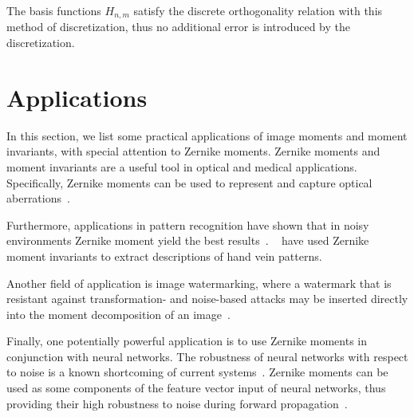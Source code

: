 The basis functions $H_{n,m}$ satisfy the discrete orthogonality relation with this method of discretization, thus no additional error is introduced by the discretization.


\section{Applications}
In this section, we list some practical applications of image moments and moment invariants, with special attention to Zernike moments.
Zernike moments and moment invariants are a useful tool in optical and medical applications. Specifically, Zernike moments can be used to represent and capture optical aberrations~\cite{wavefront,optical_human_eye,opt_surf}.

Furthermore, applications in pattern recognition have shown that in noisy environments Zernike moment yield the best results~\cite{pattern_recognition}. \citeauthor{hand_vein}~\cite{hand_vein} have used Zernike moment invariants to extract descriptions of hand vein patterns.

Another field of application is image watermarking, where a watermark that is resistant against transformation- and noise-based attacks may be inserted directly into the moment decomposition of an image~\cite{watermarking_auth, robust_watermarking, invariant_watermark}.

Finally, one potentially powerful application is to use Zernike moments in conjunction with neural networks. The robustness of neural networks with respect to noise is a known shortcoming of current systems~\cite{nn_robust,nn_noise_robust}. Zernike moments can be used as some components of the feature vector input of neural networks, thus providing their high robustness to noise during forward propagation~\cite{zernike_nn,zernike_nn2}. 
